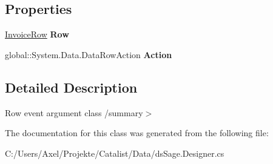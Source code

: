\subsection*{Properties}
\begin{DoxyCompactItemize}
\item 
\hyperlink{class_products_1_1_data_1_1ds_sage_1_1_invoice_row}{Invoice\+Row} {\bfseries Row}\hypertarget{class_products_1_1_data_1_1ds_sage_1_1_invoice_row_change_event_aac2d1e2a38efa1ff884795d127aa67e2}{}\label{class_products_1_1_data_1_1ds_sage_1_1_invoice_row_change_event_aac2d1e2a38efa1ff884795d127aa67e2}

\item 
global\+::\+System.\+Data.\+Data\+Row\+Action {\bfseries Action}\hypertarget{class_products_1_1_data_1_1ds_sage_1_1_invoice_row_change_event_aa8b79a6b6643a4d28d6bb712e2b794da}{}\label{class_products_1_1_data_1_1ds_sage_1_1_invoice_row_change_event_aa8b79a6b6643a4d28d6bb712e2b794da}

\end{DoxyCompactItemize}


\subsection{Detailed Description}
Row event argument class /summary$>$ 

The documentation for this class was generated from the following file\+:\begin{DoxyCompactItemize}
\item 
C\+:/\+Users/\+Axel/\+Projekte/\+Catalist/\+Data/ds\+Sage.\+Designer.\+cs\end{DoxyCompactItemize}
